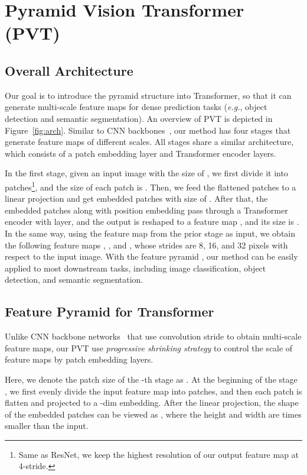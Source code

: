 \documentclass[10pt,twocolumn,letterpaper]{article}
\def\eg{\emph{e.g.}}
\begin{document}
\section{Pyramid Vision Transformer (PVT)}
\subsection{Overall Architecture}
Our goal is to introduce the pyramid structure into Transformer, so that it can generate multi-scale feature maps for dense prediction tasks (\eg, object detection and semantic segmentation).
An overview of PVT is depicted in Figure~\ref{fig:arch}.
Similar to CNN backbones~\cite{he2016deep}, our method has four stages that generate feature maps of different scales.
All stages share a similar architecture, which consists of a patch embedding layer and  Transformer encoder layers.

In the first stage, given an input image with the size of , we first divide it into  patches\footnote{Same as ResNet, we keep the highest resolution of our output feature map at 4-stride.}, and the size of each patch is .
Then, we feed the flattened patches to a linear projection and get embedded patches with size of .
After that, the embedded patches along with position embedding pass through a Transformer encoder with  layer, and the output is reshaped to a feature map , and its size is . 
In the same way, using the feature map from the prior stage as input, we obtain the following feature maps , , and , whose strides are 8, 16, and 32 pixels with respect to the input image.
With the feature pyramid , our method can be easily applied to most downstream tasks, including image classification, object detection, and semantic segmentation.

\subsection{Feature Pyramid for Transformer}
Unlike CNN backbone networks~\cite{he2016deep} that use convolution stride to obtain multi-scale feature maps, our PVT use \textit{progressive shrinking strategy} to control the scale of feature maps by patch embedding layers.

Here, we denote the patch size of the -th stage as .
At the beginning of the stage , we first evenly divide the input feature map  into  patches, 
and then each patch is flatten and projected to a -dim embedding. 
After the linear projection, the shape of the embedded patches can be viewed as , where the height and width are  times smaller than the input.
\end{document}
